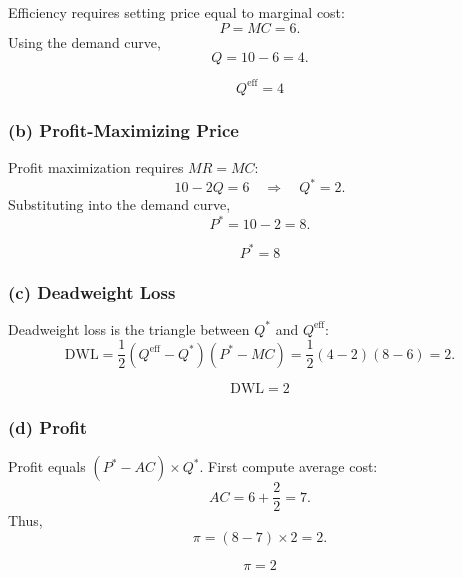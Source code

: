 \documentclass[12pt]{article}
\begin{document}
Efficiency requires setting price equal to marginal cost:
\[
    P = MC = 6.
\]
Using the demand curve,
\[
    Q = 10 - 6 = 4.
\]

\[
    \boxed{Q^{\text{eff}} = 4}
\]

\subsubsection*{(b) Profit-Maximizing Price}

Profit maximization requires \(MR = MC\):
\[
    10 - 2Q = 6 \quad \Rightarrow \quad Q^* = 2.
\]
Substituting into the demand curve,
\[
    P^* = 10 - 2 = 8.
\]

\[
    \boxed{P^* = 8}
\]

\subsubsection*{(c) Deadweight Loss}

Deadweight loss is the triangle between \(Q^*\) and \(Q^{\text{eff}}\):
\[
    \text{DWL} = \frac{1}{2}(Q^{\text{eff}} - Q^*)(P^* - MC)
    = \frac{1}{2}(4 - 2)(8 - 6) = 2.
\]

\[
    \boxed{\text{DWL} = 2}
\]

\subsubsection*{(d) Profit}

Profit equals \((P^* - AC)\times Q^*\). First compute average cost:
\[
    AC = 6 + \frac{2}{2} = 7.
\]
Thus,
\[
    \pi = (8 - 7)\times 2 = 2.
\]

\[
    \boxed{\pi = 2}
\]
\end{document}
